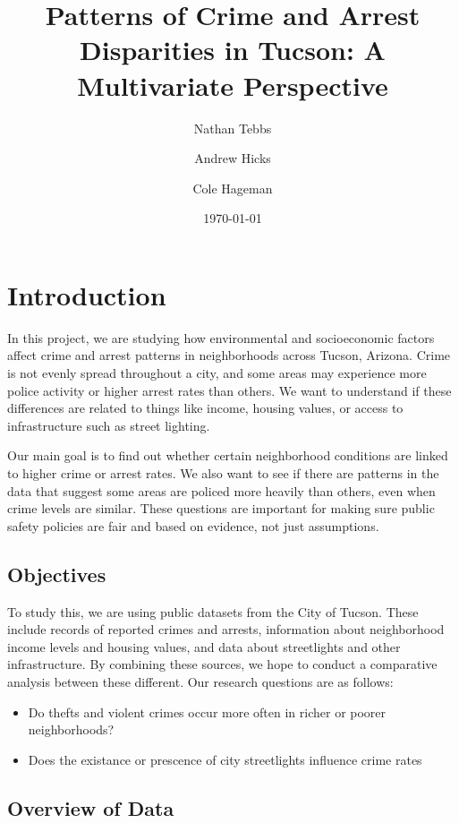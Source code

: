\documentclass{report}
\title{\textbf{Patterns of Crime and Arrest Disparities in Tucson: A Multivariate Perspective}}
\author{Nathan Tebbs \and Andrew Hicks \and Cole Hageman}
\date{\today}
\begin{document}
\maketitle
\tableofcontents


\chapter{Introduction}

In this project, we are studying how environmental and socioeconomic factors affect crime and arrest patterns in neighborhoods across Tucson, Arizona. Crime is not evenly spread throughout a city, and some areas may experience more police activity or higher arrest rates than others. We want to understand if these differences are related to things like income, housing values, or access to infrastructure such as street lighting.

Our main goal is to find out whether certain neighborhood conditions are linked to higher crime or arrest rates. We also want to see if there are patterns in the data that suggest some areas are policed more heavily than others, even when crime levels are similar. These questions are important for making sure public safety policies are fair and based on evidence, not just assumptions.

\newpage
\section{Objectives}

To study this, we are using public datasets from the City of Tucson. These include records of reported crimes and arrests, information about neighborhood income levels and housing values, and data about streetlights and other infrastructure. By combining these sources, we hope to conduct a comparative analysis between these different. Our research questions are as follows:

\begin{itemize}
\item Do thefts and violent crimes occur more often in richer or poorer neighborhoods?
\item Does the existance or prescence of city streetlights influence crime rates
\end{itemize}

\section{Overview of Data}
\end{document}
